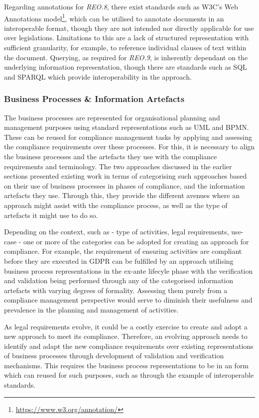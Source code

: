 Regarding annotations for \textit{REO.8}, there exist standards such as W3C's Web Annotations model\footnote{\url{https://www.w3.org/annotation/}}, which can be utilised to annotate documents in an interoperable format, though they are not intended nor directly applicable for use over legislations.
Limitations to this are a lack of structured representation with sufficient granularity, for example, to reference individual clauses of text within the document.
Querying, as required for \textit{REO.9}, is inherently dependant on the underlying information representation, though there are standards such as SQL and SPARQL which provide interoperability in the approach.

\subsubsection{Business Processes \& Information Artefacts}
The business processes are represented for organisational planning and management purposes using standard representations such as UML and BPMN. These can be reused for compliance management tasks by applying and assessing the compliance requirements over these processes. For this, it is necessary to align the business processes and the artefacts they use with the compliance requirements and terminology. The two approaches discussed in the earlier sections presented existing work in terms of categorising such approaches based on their use of business processes in phases of compliance, and the information artefacts they use. Through this, they provide the different avenues where an approach might assist with the compliance process, as well as the type of artefacts it might use to do so.

Depending on the context, such as - type of activities, legal requirements, use-case - one or more of the categories can be adopted for creating an approach for compliance. For example, the requirement of ensuring activities are compliant before they are executed in GDPR can be fulfilled by an approach utilising business process representations in the ex-ante lifecyle phase with the verification and validation being performed through any of the categorised information artefacts with varying degrees of formality. Assessing them purely from a compliance management perspective would serve to diminish their usefulness and prevalence in the planning and management of activities.

As legal requirements evolve, it could be a costly exercise to create and adopt a new approach to meet its compliance. Therefore, an evolving approach needs to identify and adapt the new compliance requirements over existing representations of business processes through development of validation and verification mechanisms.
This requires the business process representations to be in an form which can reused for such purposes, such as through the example of interoperable standards.


